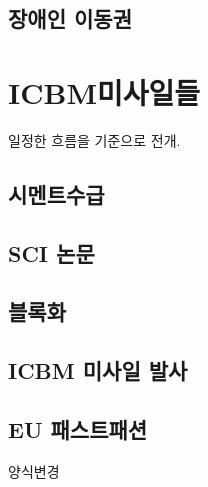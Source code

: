 \documentclass[preprint]{revtex4-2}
\begin{document}
\subsection{장애인 이동권}





\section{ICBM미사일들}

일정한 흐름을 기준으로 전개.

\subsection{시멘트수급}

\subsection{SCI 논문}

\subsection{블록화}

\subsection{ICBM 미사일 발사}

\subsection{EU 패스트패션}

양식변경
\end{document}
